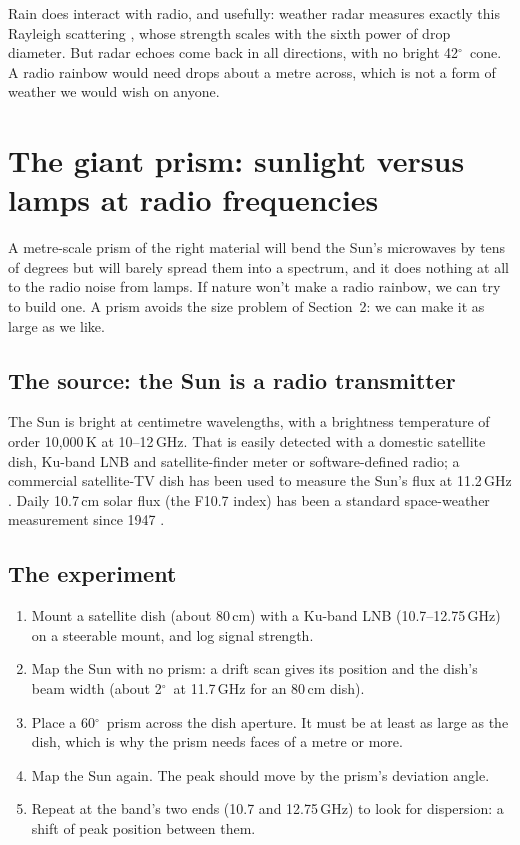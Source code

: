\documentclass[11pt,a4paper]{article}
\newcommand{\dg}{\ensuremath{^\circ}}
\begin{document}
Rain does interact with radio, and usefully: weather radar measures exactly this Rayleigh scattering \citep{noaanws}, whose strength scales with the sixth power of drop diameter. But radar echoes come back in all directions, with no bright 42\dg\ cone. A radio rainbow would need drops about a metre across, which is not a form of weather we would wish on anyone.

\section{The giant prism: sunlight versus lamps at radio frequencies}

A metre-scale prism of the right material will bend the Sun's microwaves by tens of degrees but will barely spread them into a spectrum, and it does nothing at all to the radio noise from lamps. If nature won't make a radio rainbow, we can try to build one. A prism avoids the size problem of Section~2: we can make it as large as we like.

\subsection{The source: the Sun is a radio transmitter}

The Sun is bright at centimetre wavelengths, with a brightness temperature of order 10{,}000\,K at 10--12\,GHz. That is easily detected with a domestic satellite dish, Ku-band LNB and satellite-finder meter or software-defined radio; a commercial satellite-TV dish has been used to measure the Sun's flux at 11.2\,GHz \citep{mandal2016}. Daily 10.7\,cm solar flux (the F10.7 index) has been a standard space-weather measurement since 1947 \citep{noaaswpc}.

\subsection{The experiment}

\begin{enumerate}
  \item Mount a satellite dish (about 80\,cm) with a Ku-band LNB (10.7--12.75\,GHz) on a steerable mount, and log signal strength.
  \item Map the Sun with no prism: a drift scan gives its position and the dish's beam width (about 2\dg\ at 11.7\,GHz for an 80\,cm dish).
  \item Place a 60\dg\ prism across the dish aperture. It must be at least as large as the dish, which is why the prism needs faces of a metre or more.
  \item Map the Sun again. The peak should move by the prism's deviation angle.
  \item Repeat at the band's two ends (10.7 and 12.75\,GHz) to look for dispersion: a shift of peak position between them.
\end{enumerate}
\end{document}
